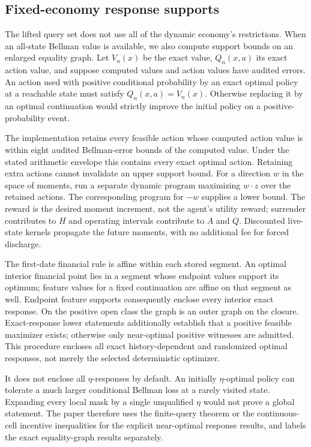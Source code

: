 \subsection{Fixed-economy response supports}
The lifted query set does not use all of the dynamic economy's restrictions. When an all-state Bellman value is available, we also compute support bounds on an enlarged equality graph. Let $V_n(x)$ be the exact value, $Q_n(x,a)$ its exact action value, and suppose computed values and action values have audited errors. An action used with positive conditional probability by an exact optimal policy at a reachable state must satisfy $Q_n(x,a)=V_n(x)$. Otherwise replacing it by an optimal continuation would strictly improve the initial policy on a positive-probability event.

The implementation retains every feasible action whose computed action value is within eight audited Bellman-error bounds of the computed value. Under the stated arithmetic envelope this contains every exact optimal action. Retaining extra actions cannot invalidate an upper support bound. For a direction $w$ in the space of moments, run a separate dynamic program maximizing $w\cdot z$ over the retained actions. The corresponding program for $-w$ supplies a lower bound. The reward is the desired moment increment, not the agent's utility reward; surrender contributes to $H$ and operating intervals contribute to $A$ and $Q$. Discounted live-state kernels propagate the future moments, with no additional fee for forced discharge.

The first-date financial rule is affine within each stored segment. An optimal interior financial point lies in a segment whose endpoint values support its optimum; feature values for a fixed continuation are affine on that segment as well. Endpoint feature supports consequently enclose every interior exact response. On the positive open class the graph is an outer graph on the closure. Exact-response lower statements additionally establish that a positive feasible maximizer exists; otherwise only near-optimal positive witnesses are admitted. This procedure encloses all exact history-dependent and randomized optimal responses, not merely the selected deterministic optimizer.

It does not enclose all $\eta$-responses by default. An initially $\eta$-optimal policy can tolerate a much larger conditional Bellman loss at a rarely visited state. Expanding every local mask by a single unqualified $\eta$ would not prove a global statement. The paper therefore uses the finite-query theorem or the continuous-cell incentive inequalities for the explicit near-optimal response results, and labels the exact equality-graph results separately.

